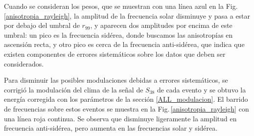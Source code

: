 Cuando se consideran los pesos, que se muestran con una línea azul en la Fig. \ref{anisotropia_rayleigh}, la amplitud de la frecuencia solar disminuye y pasa a estar por debajo del umbral de $r_{99}$, y aparecen dos amplitudes por encima de este umbral: un pico es la frecuencia sidérea, donde buscamos las anisotropías en ascensión recta, y otro pico es cerca de la frecuencia anti-sidérea, que indica que existen componentes de errores sistemáticos sobre los datos que deben ser considerados. 

Para disminuir las posibles modulaciones debidas a errores sistemáticos, se corrigió la modulación del clima de la  señal de $S_{38}$ de cada evento y se obtuvo la energía corregida con los parámetros de la sección \ref{ALL_modulacion}. El barrido de frecuencias sobre estos eventos se muestra en la Fig.\,\ref{anisotropia_rayleigh} con una línea roja continua. Se observa que disminuye ligeramente la amplitud en frecuencia anti-sidérea, pero aumenta en las frecuencias solar y sidérea.


